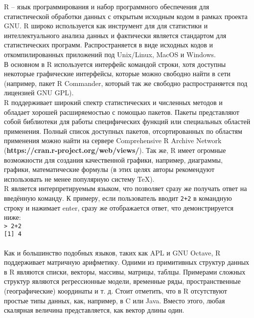 
    R – язык программирования и набор программного обеспечения для статистической обработки 
    данных с открытым исходным кодом в рамках проекта GNU. R широко используется как 
    инструмент для для статистики и интеллектуального анализа данных и фактически является стандартом
    для статистических программ. Распространяется в виде исходных кодов и откомпилированных
    приложений под Unix/Linux, MacOS и Windows. \\
    
    \indent В основном в R используется интерфейс командой строки, хотя доступны некоторые графические
    интерфейсы, которые можно свободно найти в сети (например, пакет R Commander, который так
    же свободно распространяется под лицензией GNU GPL). \\ 
    
    \indent R поддерживает широкий спектр статистических и численных методов и обладает хорошей расширяемостью 
    с помощью пакетов. Пакеты представляют собой библиотеки для работы специфических функций или 
    специальных областей применения. Полный список доступных пакетов, отсортированных по областям 
    применения можно найти на сервере Comprehensive R Archive Network (\textbf{https://cran.r-project.org/web/views/}). Так же, R имеет огромные 
    возможности для создания качественной графики, например, диаграммы, графики, математические формулы 
    (в этих целях авторы рекомендуют использовать не менее популярную систему TeX). \\
    
    \indent R является интерпретируемым языком, что позволяет сразу же получать ответ на введённую
    команду. К примеру, если пользователь вводит \texttt{2+2} в командную строку и нажимает enter, сразу же
    отображается ответ, что демонстрируется ниже: \\
    \indent \texttt{> 2+2} \\ 
    \indent \texttt{[1] 4} \\ \\
    
    \indent Как и большинство подобных языков, таких как APL и GNU Octave, R поддерживает матричную арифметику.
    Одними из примитивных структур данных в R являются списки, векторы, массивы, матрицы, таблцы.
    Примерами сложных структур являются регрессионные модели, временные ряды, пространственные 
    (географические) координаты и т. д. Стоит отметить, что в R отсутствуют простые типы данных, как,
    например, в C или Java. Вместо этого, любая скалярная величина представляется, как вектор длины один. \\ \\ 
